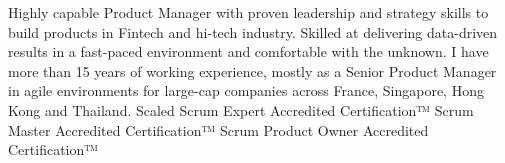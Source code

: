 

\begin{cvparagraph}


Highly capable Product Manager with proven leadership and strategy skills to build products in Fintech and hi-tech industry. Skilled at delivering data-driven results in a fast-paced environment and comfortable with the unknown. I have more than 15 years of working experience, mostly as a Senior Product Manager in agile environments for large-cap companies across France, Singapore, Hong Kong and Thailand.
\newline
Scaled Scrum Expert Accredited Certification™
\newline
Scrum Master Accredited Certification™
\newline
Scrum Product Owner Accredited Certification™

\end{cvparagraph}
